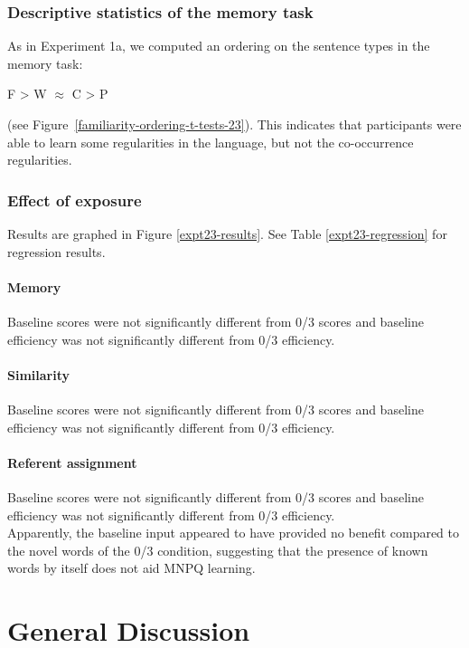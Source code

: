 \documentclass[man,floatsintext]{apa6}
\begin{document}
\subsubsection{Descriptive statistics of the memory task}
As in Experiment 1a, we computed an ordering on the sentence types in the memory task:
\begin{center}
F > W $\approx$ C > P
\end{center}
\noindent (see Figure~\ref{familiarity-ordering-t-tests-23}). This indicates that participants were able to learn some regularities in the language, but not the co-occurrence regularities.

\subsubsection{Effect of exposure}

Results are graphed in Figure \ref{expt23-results}. See Table \ref{expt23-regression} for regression results.

\paragraph{Memory}
Baseline scores were not significantly different from 0/3 scores and baseline efficiency was not significantly different from 0/3 efficiency.

\paragraph{Similarity}
Baseline scores were not significantly different from 0/3 scores and baseline efficiency was not significantly different from 0/3 efficiency.

\paragraph{Referent assignment}
Baseline scores were not significantly different from 0/3 scores and baseline efficiency was not significantly different from 0/3 efficiency.\\

Apparently, the baseline input appeared to have provided no benefit compared to the novel words of the 0/3 condition, suggesting that the presence of known words by itself does not aid MNPQ learning.

\section{General Discussion}
\end{document}
